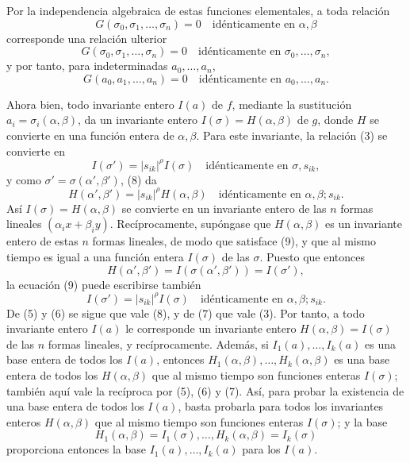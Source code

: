 Por la independencia algebraica de estas funciones elementales, a toda relación
\begin{equation}
        G(\sigma_0,\sigma_1,\ldots,\sigma_n)=0
        \quad \text{idénticamente en \(\alpha,\beta\)}
\end{equation}
corresponde una relación ulterior
\begin{equation}
        G(\sigma_0,\sigma_1,\ldots,\sigma_n)=0
        \quad \text{idénticamente en \(\sigma_0,\ldots,\sigma_n\)},
\end{equation}
y por tanto, para indeterminadas \(a_0,\ldots,a_n\),
\begin{equation}
        G(a_0,a_1,\ldots,a_n)=0
        \quad \text{idénticamente en \(a_0,\ldots,a_n\)}.
\end{equation}

Ahora bien, todo invariante entero \(I(a)\) de \(f\), mediante la sustitución \(a_i=\sigma_i(\alpha,\beta)\), da un invariante entero \(I(\sigma)=H(\alpha,\beta)\) de \(g\), donde \(H\) se convierte en una función entera de \(\alpha,\beta\). Para este invariante, la relación (3) se convierte en
\begin{equation}
        I(\sigma')=|s_{ik}|^\rho I(\sigma)
        \quad \text{idénticamente en \(\sigma,s_{ik}\)},
\end{equation}
y como \(\sigma'=\sigma(\alpha',\beta')\), (8) da
\begin{equation}
        H(\alpha',\beta')=|s_{ik}|^\rho H(\alpha,\beta)
        \quad \text{idénticamente en \(\alpha,\beta;s_{ik}\)}.
\end{equation}
Así \(I(\sigma)=H(\alpha,\beta)\) se convierte en un invariante entero de las \(n\) formas lineales \((\alpha_i x+\beta_i y)\). Recíprocamente, supóngase que \(H(\alpha,\beta)\) es un invariante entero de estas \(n\) formas lineales, de modo que satisface (9), y que al mismo tiempo es igual a una función entera \(I(\sigma)\) de las \(\sigma\). Puesto que entonces
\[
        H(\alpha',\beta')=I(\sigma(\alpha',\beta'))=I(\sigma'),
\]
la ecuación (9) puede escribirse también
\begin{equation*}
        I(\sigma')=|s_{ik}|^\rho I(\sigma)
        \quad \text{idénticamente en \(\alpha,\beta;s_{ik}\)}.\tag{9a}
\end{equation*}
De (5) y (6) se sigue que vale (8), y de (7) que vale (3). Por tanto, a todo invariante entero \(I(a)\) le corresponde un invariante entero \(H(\alpha,\beta)=I(\sigma)\) de las \(n\) formas lineales, y recíprocamente. Además, si \(I_1(a),\ldots,I_k(a)\) es una base entera de todos los \(I(a)\), entonces \(H_1(\alpha,\beta),\ldots,H_k(\alpha,\beta)\) es una base entera de todos los \(H(\alpha,\beta)\) que al mismo tiempo son funciones enteras \(I(\sigma)\); también aquí vale la recíproca por (5), (6) y (7). Así, para probar la existencia de una base entera de todos los \(I(a)\), basta probarla para todos los invariantes enteros \(H(\alpha,\beta)\) que al mismo tiempo son funciones enteras \(I(\sigma)\); y la base
\[
        H_1(\alpha,\beta)=I_1(\sigma),\ldots,H_k(\alpha,\beta)=I_k(\sigma)
\]
proporciona entonces la base \(I_1(a),\ldots,I_k(a)\) para los \(I(a)\).

